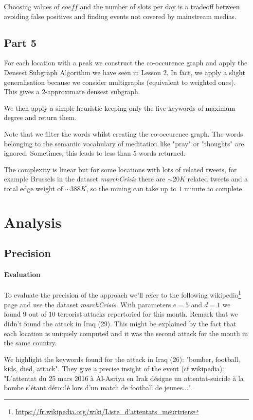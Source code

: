 \documentclass[a4paper]{article}
\begin{document}
 Choosing values of $coeff$ and the number of slots per day is a tradeoff between avoiding false positives and finding events not covered by mainstream medias.
 
\subsection{Part 5}

For each location with a peak we construct the co-occurence graph and apply the Densest Subgraph Algorithm we have seen in Lesson $2$. In fact, we apply a slight generalisation because we consider multigraphs (equivalent to weighted ones). This gives a $2$-approximate densest subgraph.

We then apply a simple heuristic keeping only the five keywords of maximum degree and return them.

Note that we filter the words whilst creating the co-occurence graph. The words belonging to the semantic vocabulary of meditation like "pray" or "thoughts" are ignored. Sometimes, this leads to less than $5$ words returned.

The complexity is linear but for some locations with lots of related tweets, for example Brussels in the dataset \textit{marchCrisis} there are $\sim 20K$ related tweets and a total edge weight of $\sim 388K$, so the mining can take up to $1$ minute to complete.

\section{Analysis}
\subsection{Precision}
\paragraph{Evaluation}
To evaluate the precision of the approach we'll refer to the following wikipedia\footnote{\url{https://fr.wikipedia.org/wiki/Liste_d'attentats_meurtriers}} page and use the dataset \textit{marchCrisis}. 
With parameters $e=5$ and $d=1$ we found $9$ out of $10$ terrorist attacks repertoried for this month. Remark that we didn't found the attack in Iraq (29). This might be explained by the fact that each location is uniquely computed and it was the second attack for the month in the same country.

We highlight the keywords found for the attack in Iraq (26): "bomber, football, kids, died, attack". They give a precise insight of the event (cf wikipedia): "L'attentat du 25 mars 2016 à Al-Asriya en Irak désigne un attentat-suicide à la bombe s'étant déroulé lors d'un match de football de jeunes...".
\end{document}
